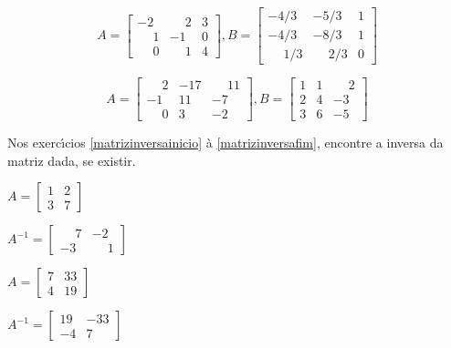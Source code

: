 \documentclass[12pt]{exam}
\begin{document}
\begin{exercicio}
  \[
    A =\begin{bmatrix}
      -2 & \phantom{-} 2 & 3\\
      \phantom{-} 1 & -1 & 0\\
      \phantom{-} 0 & \phantom{-} 1 & 4
    \end{bmatrix}, B =\begin{bmatrix}
      -4/3 & -5/3 & 1\\
      -4/3 & -8/3 & 1\\
      \phantom{-} 1/3 & \phantom{-} 2/3 & 0
    \end{bmatrix}
  \]
\end{exercicio}

\begin{exercicio}\label{matrizfim}
  \[
    A =\begin{bmatrix}
      \phantom{-} 2 & -17 & \phantom{-} 11\\
      -1 & 11 & -7\\
      \phantom{-} 0 & 3 & -2
    \end{bmatrix}, B =\begin{bmatrix}
      1 & 1 & \phantom{-} 2\\
      2 & 4 & -3\\
      3 & 6 & -5
    \end{bmatrix}
  \]
\end{exercicio}

Nos exerc{\'\i}cios \ref{matrizinversainicio} \`a \ref{matrizinversafim}, encontre a inversa da matriz dada, se existir.

\begin{exercicio}\label{matrizinversainicio}
  $
    A =\begin{bmatrix}
        1 & 2\\
        3 & 7
    \end{bmatrix}
  $
  \begin{solucao}
    $A^{-1} =\begin{bmatrix}
      \phantom{-} 7 & -2\\
      -3 & \phantom{-} 1
    \end{bmatrix}$
  \end{solucao}
\end{exercicio}

\begin{exercicio}
  $
    A =\begin{bmatrix}
        7 & 33\\
        4 & 19
    \end{bmatrix}
  $
  \begin{solucao}
    $A^{-1} =\begin{bmatrix}
      19 & -33\\
      -4 & 7
    \end{bmatrix}$
  \end{solucao}
\end{exercicio}
\end{document}
